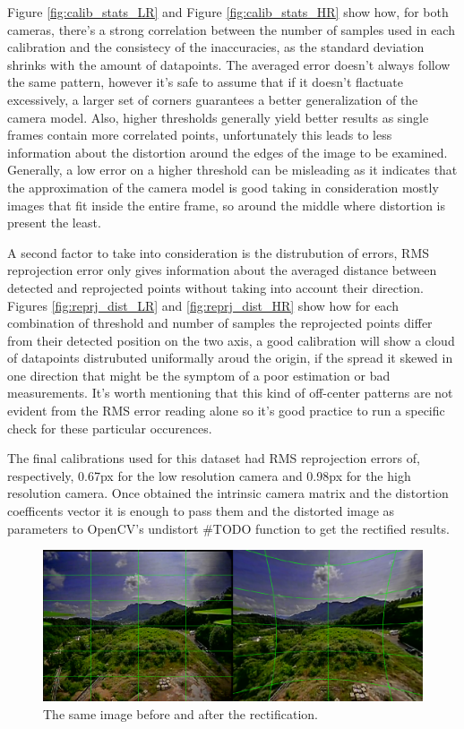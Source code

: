 Figure \ref{fig:calib_stats_LR} and Figure \ref{fig:calib_stats_HR} show how, for both cameras, there's a strong correlation between the number of samples used in each calibration and the consistecy of the inaccuracies, as the standard deviation shrinks with the amount of datapoints. The averaged error doesn't always follow the same pattern, however it's safe to assume that if it doesn't flactuate excessively, a larger set of corners guarantees a better generalization of the camera model. Also, higher thresholds generally yield better results as single frames contain more correlated points, unfortunately this leads to less information about the distortion around the edges of the image to be examined. Generally, a low error on a higher threshold can be misleading as it indicates that the approximation of the camera model is good taking in consideration mostly images that fit inside the entire frame, so around the middle where distortion is present the least.

A second factor to take into consideration is the distrubution of errors, RMS reprojection error only gives information about the averaged distance between detected and reprojected points without taking into account their direction. Figures \ref{fig:reprj_dist_LR} and \ref{fig:reprj_dist_HR} show how for each combination of threshold and number of samples the reprojected points differ from their detected position on the two axis, a good calibration will show a cloud of datapoints distrubuted uniformally aroud the origin, if the spread it skewed in one direction that might be the symptom of a poor estimation or bad measurements. It's worth mentioning that this kind of off-center patterns are not evident from the RMS error reading alone so it's good practice to run a specific check for these particular occurences.

The final calibrations used for this dataset had RMS reprojection errors of, respectively, 0.67px for the low resolution camera and 0.98px for the high resolution camera. Once obtained the intrinsic camera matrix and the distortion coefficents vector it is enough to pass them and the distorted image as parameters to OpenCV's undistort \#TODO function to get the rectified results.

\begin{figure}[H]
  \centering
  \includegraphics[scale=0.4]{figures/bef_aft_rect.png}
  \caption{The same image before and after the rectification.}
  \label{img:rectify_sbs}
\end{figure}

